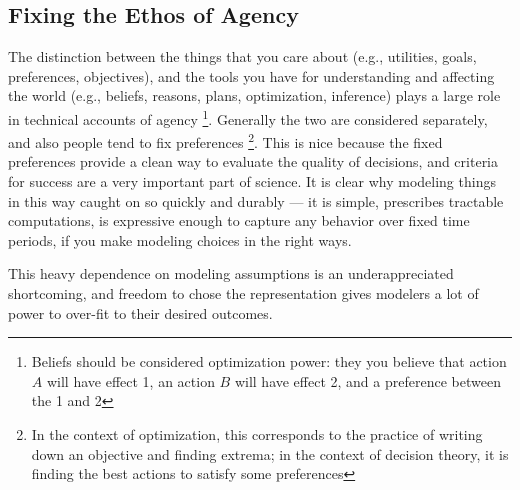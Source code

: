 \documentclass{article}
\begin{document}
	\subsection{Fixing the Ethos of Agency}
	The distinction between the things that you care about (e.g., utilities, goals, preferences, objectives), and the tools you have for understanding and affecting the world (e.g., beliefs, reasons, plans, optimization, inference) plays a large role in technical accounts of agency%
	\footnote{Beliefs should be considered optimization power: they you believe that action $A$ will have effect 1, an action $B$ will have effect 2, and a preference between the 1 and 2}.
	Generally the two are considered separately, and also people tend to fix preferences%
	\footnote{In the context of optimization, this corresponds to the practice of writing down an objective and finding extrema; in the context of decision theory, it is finding the best actions to satisfy some preferences}. 
	This is nice because the fixed preferences provide a clean way to evaluate the quality of decisions, and criteria for success are a very important part of science. It is clear why modeling things in this way caught on so quickly and durably --- it is simple, prescribes tractable computations, is expressive enough to capture any behavior over fixed time periods, if you make modeling choices in the right ways. 
	
	This heavy dependence on modeling assumptions is an underappreciated shortcoming, and freedom to chose the representation gives modelers a lot of power to over-fit to their desired outcomes. 
	
\end{document}
